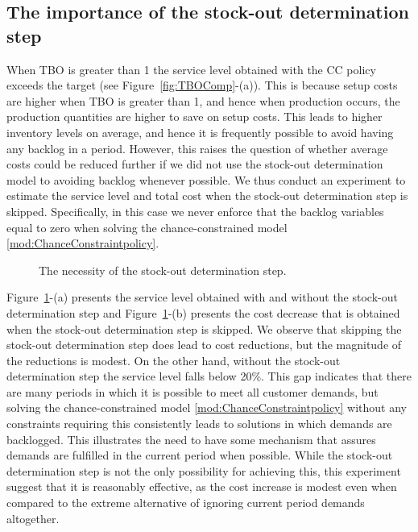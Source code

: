 \documentclass[msom]{oo}
\begin{document}
\subsection{The importance of the stock-out determination step}

    When TBO is greater than 1 the service level obtained with the CC policy exceeds the target  (see Figure~\ref{fig:TBOComp}-(a)). This is because setup costs are higher when TBO is greater than 1, and hence when production occurs, the production quantities are higher to save on setup costs. This leads to higher inventory levels on average, and hence it is frequently possible to avoid having any backlog in a period. However, this raises the question of whether average costs could be reduced further if we did not use the stock-out determination model to avoiding backlog whenever possible. We thus conduct an experiment to estimate the service level and total cost when the stock-out determination step is skipped. Specifically, in this case we never enforce that the backlog variables equal to zero when solving the chance-constrained model \eqref{mod:ChanceConstraintpolicy}.
    
    \begin{figure} [ht]
    \centering
    \caption{The necessity of the stock-out determination step.}%
    \label{fig:BacklogDetermination}%
\end{figure}
    Figure~\ref{fig:BacklogDetermination}-(a) presents the service level obtained with and without the stock-out determination step and
    Figure~\ref{fig:BacklogDetermination}-(b) presents the cost decrease that is obtained when the stock-out determination step is skipped. We observe that skipping the stock-out determination step does lead to cost reductions, but the magnitude of the reductions is modest. On the other hand, without the stock-out determination step the service level falls below 20\%. This gap indicates that there are many periods in which it is possible to meet all customer demands, but solving the chance-constrained model \eqref{mod:ChanceConstraintpolicy} without any constraints requiring this consistently leads to solutions in which demands are backlogged. This illustrates the need to have some mechanism that assures demands are fulfilled in the current period when possible. While the stock-out determination step is not the only possibility for achieving this, this experiment suggest that it is reasonably effective, as the cost increase is modest even when compared to the extreme alternative of ignoring current period demands altogether. 
\end{document}
